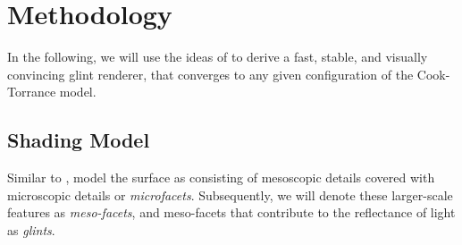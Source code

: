 \section{Methodology}
\label{sec:methodology}
%
In the following, we will use the ideas of \textcite{deliot2023} to derive a fast, stable, and visually convincing glint renderer, that converges to any given configuration of the Cook-Torrance model.




\subsection{Shading Model}
\label{sec:shading}
%
Similar to \textcite{zirr2016}, \textcite{deliot2023} model the surface as consisting of mesoscopic details covered with microscopic details or \emph{microfacets}.
%
Subsequently, we will denote these larger-scale features as \emph{meso-facets}, and 
meso-facets that contribute to the reflectance of light as \emph{glints}. 


